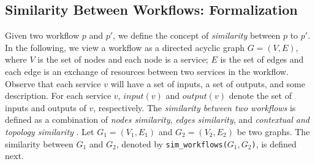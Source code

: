 \documentclass{new_tlp}
\begin{document}
\subsection{Similarity Between Workflows: Formalization} 
\label{sub:similarity_lib}
%
{ 

Given two workflow $p$ and $p'$, we define the concept of  \emph{similarity} between $p$ to $p'$.  
In the following, we view a workflow as a directed acyclic graph  $G = (V, E)$, where  $V$ is the set of nodes  and each node is a service; $E$ is the set of edges and each edge is an exchange of resources between two services in the workflow. Observe that each service $v$ will have a set of inputs, a set of outputs, and some description. 
For each service $v$, $input(v)$ and $output(v)$ denote the set of inputs and outputs of $v$, respectively.  
The \emph{similarity between two workflows} is defined as a combination of \emph{nodes similarity}, \emph{edges similarity}, and \emph{contextual and topology similarity} \cite{BeckerL12,AntunesBBCDFDFG15}. 
Let $G_1 = (V_1, E_1)$  and $G_2 = (V_2, E_2)$ be two graphs. 
The similarity between $G_1$ and $G_2$, 
denoted by  \texttt{sim\_workflows($G_1,G_2$)},  is defined next.  

}
\end{document}
